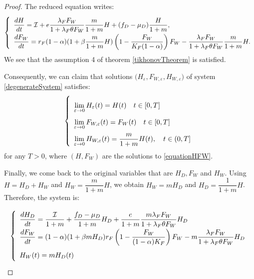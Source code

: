 \documentclass{article}
\newcommand{\lfw}{\lambda_{F}}
\newcommand{\lfw}{\lambda_{F}}
\newcommand{\cI}{\mathcal{I}}
\renewcommand{\epsilon}{\varepsilon}
\begin{document}
\begin{proof}
The reduced equation writes:
\begin{equation} \label{equationHFW}
\def\arraystretch{2}
\left\lbrace \begin{array}{l}
\dfrac{dH}{dt}= \cI + e\dfrac{\lfw F_W}{1 + \lfw \theta F_W}\dfrac{m}{1+m}H + (f_D - \mu_D)\dfrac{H}{1+m}, \\
\dfrac{dF_W}{dt} = r_F(1- \alpha) (1+ \beta \dfrac{m}{1+m}H ) \left(1 - \dfrac{F_W}{K_F(1-\alpha)} \right) F_W - \dfrac{\lfw F_W}{1 + \lfw \theta F_W} \dfrac{m}{1+m}H.  \\
\end{array} \right.
\end{equation}
We see that the assumption 4 of theorem \eqref{tikhonovTheorem} is satisfied.

Consequently, we can claim that solutions 
$\Big(H_{ \epsilon}, F_{W,  \epsilon}, H_{W,  \epsilon} \Big)$  of system \eqref{degenerateSystem} satisfies:
\begin{equation}
\def\arraystretch{2}
\left\lbrace \begin{array}{l}
\lim\limits_{ \epsilon \rightarrow 0}{H_{ \epsilon}(t)} = H(t) \quad t \in [0,T] \\
\lim\limits_{ \epsilon \rightarrow 0} F_{W,  \epsilon}(t) = F_W(t)\quad t \in [0,T] \\
 \lim\limits_{ \epsilon \rightarrow 0} H_{W,  \epsilon}(t) = \dfrac{m}{1+m}H(t), \quad  t\in (0,T] \\
\end{array} \right.
\end{equation}
for any $T > 0$, where $(H, F_W)$ are the solutions to \eqref{equationHFW}. 

\medskip
Finally, we come back to the original variables that are $H_D, F_W$ and $H_W$. Using $H = H_D + H_W$ and $H_W = \dfrac{m}{1+m}H$, we obtain $H_W = m H_D$ and $H_D = \dfrac{1}{1+m}	H$. Therefore, the system is:

\begin{equation}
\def\arraystretch{2}
\left\lbrace \begin{array}{l}
\dfrac{dH_D}{dt} = \dfrac{\cI}{1+m} + \dfrac{f_D - \mu_D}{1+m} H_D + \dfrac{e }{1+m} \dfrac{m \lfw F_W}{1 + \lfw \theta F_W}H_D \\
\dfrac{dF_W}{dt} = (1-\alpha) (1+\beta m H_D) r_F \left(1 - \dfrac{F_W}{(1-\alpha)K_F} \right) F_W - m \dfrac{\lfw F_W}{1 + \lfw \theta F_W} H_D \\
H_W(t) = m H_D(t)
\end{array} \right.
\end{equation}
\end{proof}
\end{document}
